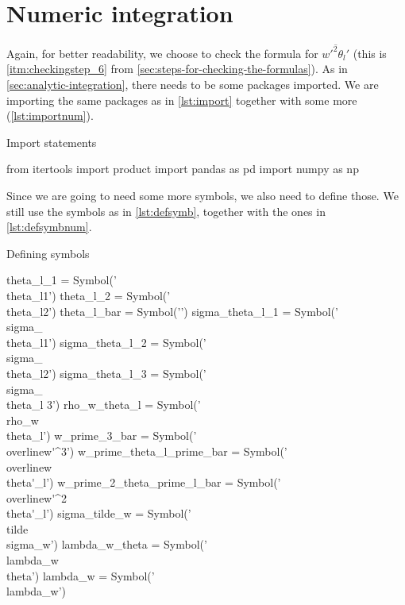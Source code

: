 \section{Numeric integration}\label{sec:numeric-integration}

Again, for better readability, we choose to check the formula for $\overline{w'^2\theta_l'}$
(this is \cref{itm:checkingstep_6} from \cref{sec:steps-for-checking-the-formulas}).
As in \cref{sec:analytic-integration}, there needs to be some packages imported.
We are importing the same packages as in \cref{lst:import} together with some more (\cref{lst:importnum}).
\begin{listing}[!ht]
    \caption{Import statements}
    \label{lst:importnum}
    \begin{pythoncode}
        from itertools import product
        import pandas as pd
        import numpy as np
    \end{pythoncode}
\end{listing}
Since we are going to need some more symbols, we also need to define those.
We still use the symbols as in \cref{lst:defsymb}, together with the ones in \cref{lst:defsymbnum}.
\begin{listing}[!ht]
    \caption{Defining symbols}
    \label{lst:defsymbnum}
    \begin{pythoncode}
        theta_l_1 = Symbol('\\theta_{l1}')
        theta_l_2 = Symbol('\\theta_{l2}')
        theta_l_bar = Symbol('')
        sigma_theta_l_1 = Symbol('\\sigma_{\\theta_{l1}}')
        sigma_theta_l_2 = Symbol('\\sigma_{\\theta_{l2}}')
        sigma_theta_l_3 = Symbol('\\sigma_{\\theta_l 3}')
        rho_w_theta_l = Symbol('\\rho_{w\\theta_l}')
        w_prime_3_bar = Symbol('\\overline{w\'^3}')
        w_prime_theta_l_prime_bar = Symbol('\\overline{w\'\\theta\'_l}')
        w_prime_2_theta_prime_l_bar = Symbol('\\overline{w\'^2\\theta\'_l}')
        sigma_tilde_w = Symbol('\\tilde{\\sigma}_w')
        lambda_w_theta = Symbol('\\lambda_{w\\theta}')
        lambda_w = Symbol('\\lambda_w')
    \end{pythoncode}
\end{listing}

